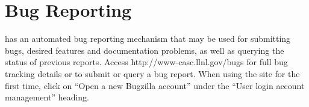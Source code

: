 
\section{Bug Reporting}

\hypre{} has an automated bug reporting mechanism that may be used for submitting 
bugs, desired features and documentation problems, as well as querying the status 
of previous reports.  Access 
{http://www-casc.llnl.gov/bugs} for full bug tracking details or to submit or query
a bug report.  When using the site for the first time, click on
``Open a new Bugzilla account'' under the ``User login account management'' heading.

